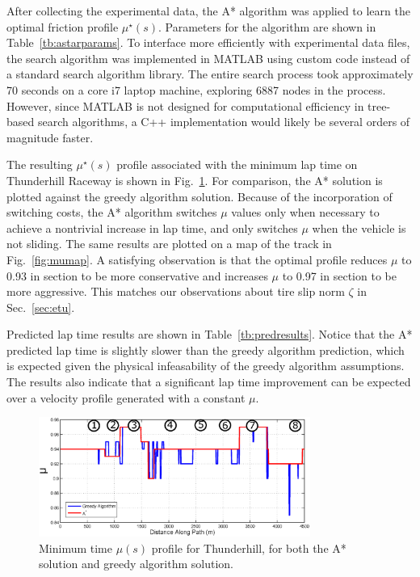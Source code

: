 \documentclass[9pt,shortpaper,twoside,web]{ieeecolor}
\newcommand*\circled[1]{\tikz[baseline=(char.base)]{
            \node[shape=circle,draw,inner sep=2pt] (char) {#1};}}
\begin{document}
{{{After collecting the experimental data, the A* algorithm was applied to learn the optimal friction profile $\mu^\star(s)$. Parameters for the algorithm
are shown in Table~\ref{tb:astarparams}. To interface more efficiently with experimental data files, the search algorithm was implemented in MATLAB using
custom code instead of a standard search algorithm library. The entire search process took approximately 70 seconds on a core i7 laptop machine,
exploring 6887 nodes in the process. However, since MATLAB is not designed for computational efficiency in tree-based search algorithms, a C++ implementation would likely
be several orders of magnitude faster. 

 The resulting $\mu^\star(s)$ profile associated with the minimum lap time on Thunderhill Raceway is shown in Fig.~\ref{fig:muprof}. For  comparison, the A* solution is plotted against the greedy algorithm solution. Because of the incorporation of switching costs,  the A* algorithm switches $\mu$ values only when necessary to achieve a nontrivial increase in lap time, and only switches $\mu$ when  the vehicle is not sliding. The same results are plotted on a map of the track in Fig.~\ref{fig:mumap}. A satisfying observation is that the optimal profile reduces $\mu$ to 0.93 in section \circled{2} to be more conservative and increases $\mu$ to 0.97 in section \circled{3} to be more aggressive. This matches our observations about tire slip norm $\zeta$ in Sec.~\ref{sec:etu}. 
 
 Predicted lap time results are shown in Table~\ref{tb:predresults}. Notice that the A* predicted lap time is slightly
 slower than the greedy algorithm prediction, which is expected given the physical infeasability of the greedy algorithm assumptions. The  results also indicate that a significant lap time improvement can be expected over a velocity profile generated with a constant $\mu$.
 
 \begin{figure}[tb]
\centering
\includegraphics[width=3.5in]{figures/muprofile.eps}
\caption{Minimum time $\mu(s)$ profile for Thunderhill, for both the A* solution and greedy algorithm solution.}
\label{fig:muprof}
\end{figure}  

}}}
\end{document}

